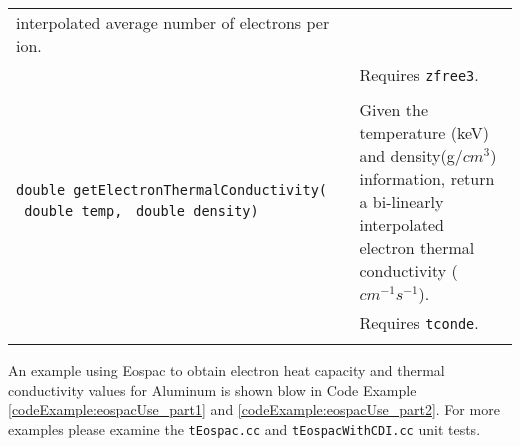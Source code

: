 \documentclass[11pt]{nmemo}
\begin{document}
\begin{table}[H]
\begin{center}
\begin{tabularx}{0.9\linewidth}{YZ}
  interpolated average number of electrons per ion.  \\
&  Requires \texttt{zfree3}. \\
\\
\texttt{double~getElectronThermalConductivity(}
\texttt{\mbox{ double~temp,}}
\texttt{\mbox{ double~density)}}
& Given the temperature (keV) and density(g/$cm^3$) information, return a bi-linearly
  interpolated electron thermal conductivity ($cm^{-1}s^{-1}$).\\
&  Requires \texttt{tconde}.\\
\\
      \end{tabularx}
    \end{center}
    \normalsize
\end{table}


An example using Eospac to obtain electron heat capacity and thermal
conductivity values for Aluminum is shown blow in Code Example~%
\ref{codeExample:eospacUse_part1} and
\ref{codeExample:eospacUse_part2}.  For more examples please examine
the \texttt{tEospac.cc} and \texttt{tEospacWithCDI.cc} unit tests.
\end{document}
